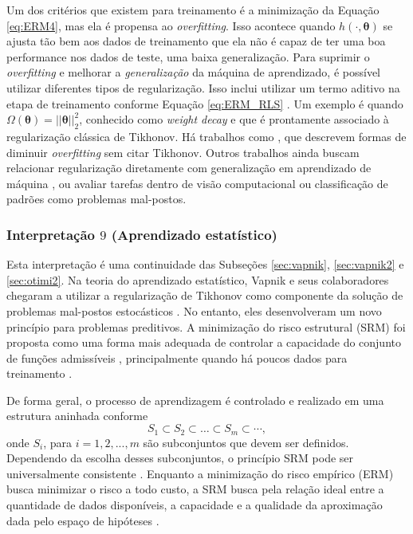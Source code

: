 Um dos critérios que existem para treinamento é a minimização da Equação \eqref{eq:ERM4}, mas ela é propensa ao \textit{overfitting}. Isso acontece quando $h(\cdot, \bm{\theta})$ se ajusta tão bem aos dados de treinamento que ela não é capaz de ter uma boa performance nos dados de teste, uma baixa generalização. Para suprimir o \textit{overfitting} e melhorar a \textit{generalização} da máquina de aprendizado, é possível utilizar diferentes tipos de regularização. Isso inclui utilizar um termo aditivo na etapa de treinamento conforme Equação \eqref{eq:ERM_RLS} \cite{Deisenroth2020, alvarez2017digital}. Um exemplo é quando $\Omega(\bm{\theta})= \vert \vert\bm{\theta} \vert\vert_2^2$, conhecido como \textit{weight decay} e que é prontamente associado à regularização clássica de Tikhonov. Há trabalhos como \cite{mitchell1997machine, nielsen2018}, que descrevem formas de diminuir \textit{overfitting} sem citar Tikhonov. Outros trabalhos ainda buscam relacionar regularização diretamente com generalização em aprendizado de máquina \cite{devito2005}, ou avaliar tarefas dentro de visão computacional \cite{Poggio1985} ou classificação de padrões \cite{Yee1993} como problemas mal-postos. 

\subsubsection{Interpretação $9$ (Aprendizado estatístico)}

Esta interpretação é uma continuidade das Subseções \ref{sec:vapnik}, \ref{sec:vapnik2} e \ref{sec:otimi2}. Na teoria do aprendizado estatístico, Vapnik e seus colaboradores chegaram a utilizar a regularização de Tikhonov como componente da solução de problemas mal-postos estocásticos \cite[pág. 297]{vapnik1998statistical}. No entanto, eles desenvolveram um novo princípio para problemas preditivos. A minimização do risco estrutural (SRM) \cite[pág. 1952]{Vapnik2019} foi proposta como uma forma mais adequada de controlar a capacidade do conjunto de funções admissíveis \cite[pág. 476]{Vapnik2006}, principalmente quando há poucos dados para treinamento \cite[pág. 219]{vapnik1998statistical}. 

De forma geral, o processo de aprendizagem é controlado e realizado em uma estrutura aninhada \cite{Chen2002} conforme
\begin{equation}
S_1 	\subset S_2 	\subset \dots \subset S_m 	\subset \cdots,
\label{eq:srm}
\end{equation}
onde $S_i$, para $i = 1, 2, ..., m$ são subconjuntos que devem ser definidos. Dependendo da escolha desses subconjuntos, o princípio SRM pode ser universalmente consistente \cite[pág. 1952]{Vapnik2019}. Enquanto a minimização do risco empírico (ERM) busca minimizar o risco a todo custo, a SRM busca pela relação ideal entre a quantidade de dados disponíveis, a capacidade e a qualidade da aproximação dada pelo espaço de hipóteses \cite[pág. 219]{vapnik1998statistical}. 

